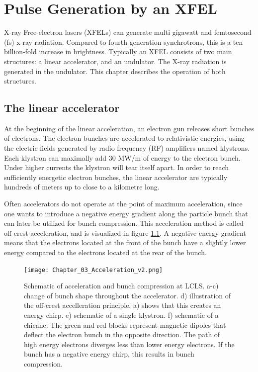 \chapter{Pulse Generation by an XFEL}
X-ray Free-electron lasers (XFELs) can generate multi gigawatt and femtosecond (fs) x-ray radiation. Compared to fourth-generation synchrotrons, this is a ten billion-fold increase in brightness. Typically an XFEL consists of two main structures: a linear accelerator, and an undulator. The X-ray radiation is generated in the undulator.  This chapter describes the operation of both structures. 

\section{The linear accelerator}

At the beginning of the linear acceleration, an electron gun releases short bunches of electrons. The electron bunches are accelerated to relativistic energies, using the electric fields generated by radio frequency (RF) amplifiers named klystrons. Each klystron can maximally add 30 MW/m of energy to the electron bunch. Under higher currents the klystron will tear itself apart. In order to reach sufficiently energetic electron bunches, the linear accelerator are typically hundreds of meters up to close to a kilometre long.

Often accelerators do not operate at the point of maximum acceleration, since one wants to introduce a negative energy gradient along the particle bunch that can later be utilized for bunch compression. This acceleration method is called off-crest acceleration, and is visualized in figure  \ref{fig:AC}. A negative energy gradient means that the electrons located at the front of the bunch have a slightly lower energy compared to the electrons located at the rear of the bunch.

\begin{figure}[h]
\centering
\texttt{[image: Chapter\_03\_Acceleration\_v2.png]}
\caption{Schematic of acceleration and bunch compression at LCLS. a-c) change of bunch shape throughout the accelerator. d) illustration of the off-crest accelleration principle. a) shows that this creates an energy chirp. e) schematic of a single klystron. f) schematic of a chicane. The green and red blocks represent magnetic dipoles that deflect the electron bunch in the opposite direction. The path of high energy electrons diverges less than lower energy electrons. If the bunch has a negative energy chirp, this results in bunch compression.}\label{fig:AC}
\end{figure}

